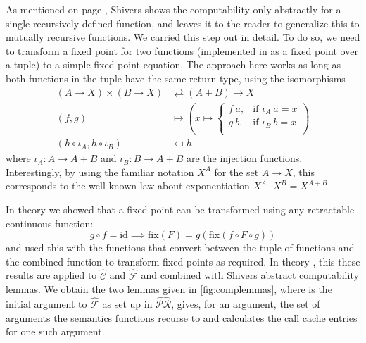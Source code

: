 \documentclass[a4paper,parskip=half,BCOR=8mm,DIV=calc,12pt]{scrbook}
\newcommand{\aC}{\widehat{\mathcal C}}
\newcommand{\aF}{\widehat{\mathcal F}}
\newcommand{\aPR}{\widehat{\mathcal {PR}}}
\newcommand{\id}{\text{id}}
\newcommand{\fix}{\text{fix}}
\begin{document}
As mentioned on page \pageref{shiverscomputabilty}, Shivers shows the computability only abstractly for a single recursively defined function, and leaves it to the reader to generalize this to mutually recursive functions. We carried this step out in detail. To do so, we need to transform a fixed point for two functions (implemented in  as a fixed point over a tuple) to a simple fixed point equation. The approach here works as long as both functions in the tuple have the same return type, using the isomorphisms
\begin{align*}
(A \to X) \times (B \to X) &\rightleftarrows  (A + B) \to X \\
(f,g) &\mapsto \left(x\mapsto
\begin{cases}
f\ a,&\text{if } \iota_A\ a = x \\
g\ b,&\text{if } \iota_B\ b = x \\
\end{cases} \right) \\
(h \circ  \iota_A, h \circ \iota_B) &\mapsfrom h
\end{align*}
where $\iota_A \colon A \to A + B$ and $\iota_B \colon B \to A + B$ are the injection functions. Interestingly, by using the familiar notation $X^A$ for the set $A\to X$, this corresponds to the well-known law about exponentiation $X^A\cdot X^B = X^{A+B}$.

In theory  we showed that a fixed point can be transformed using any retractable continuous function:
\[
g \circ f = \id \implies \fix(F) = g(\fix(f \circ F \circ g))
\]
and used this with the functions that convert between the tuple of functions and the combined function to transform fixed points as required. In theory , this these results are applied to $\aC$ and $\aF$ and combined with Shivers abstract computability lemmas. We obtain the two lemmas given in \vref{fig:complemmas}, where  is the initial argument to $\aF$ as set up in $\aPR$,  gives, for an argument, the set of arguments the semantics functions recurse to and  calculates the call cache entries for one such argument.
\end{document}
